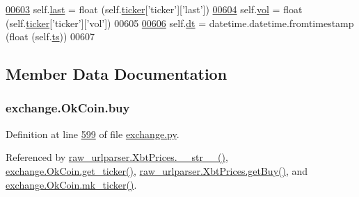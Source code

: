 \begin{DoxyCode}
\hypertarget{classexchange_1_1_ok_coin.tex_l00603}{}\hyperlink{classexchange_1_1_ok_coin_a726afbe3a75835fdcbe523aed8d6763c}{00603}         self.\hyperlink{classexchange_1_1_ok_coin_a726afbe3a75835fdcbe523aed8d6763c}{last} = float (self.\hyperlink{classexchange_1_1_exchange_a7cf9e52f993627955a2e242c388daaeb}{ticker}[\textcolor{stringliteral}{'ticker'}][\textcolor{stringliteral}{'last'}])
\hypertarget{classexchange_1_1_ok_coin.tex_l00604}{}\hyperlink{classexchange_1_1_ok_coin_ad0e78d6b3c0a24504be72a0216fc6549}{00604}         self.\hyperlink{classexchange_1_1_ok_coin_ad0e78d6b3c0a24504be72a0216fc6549}{vol}  = float (self.\hyperlink{classexchange_1_1_exchange_a7cf9e52f993627955a2e242c388daaeb}{ticker}[\textcolor{stringliteral}{'ticker'}][\textcolor{stringliteral}{'vol'}])
00605     
\hypertarget{classexchange_1_1_ok_coin.tex_l00606}{}\hyperlink{classexchange_1_1_ok_coin_ade9d7cddcfa54f2b1ba5452854bfd48b}{00606}         self.\hyperlink{classexchange_1_1_ok_coin_ade9d7cddcfa54f2b1ba5452854bfd48b}{dt} = datetime.datetime.fromtimestamp (float (self.\hyperlink{classexchange_1_1_ok_coin_a0fe6263a7f58a6fa8a688929976b7e4a}{ts}))
00607     
\end{DoxyCode}


\subsection{Member Data Documentation}
\subsubsection[{\texorpdfstring{buy}{buy}}]{\setlength{\rightskip}{0pt plus 5cm}exchange.\+Ok\+Coin.\+buy}\hypertarget{classexchange_1_1_ok_coin_aaf828e37142a83cbfb12d193313f6d43}{}\label{classexchange_1_1_ok_coin_aaf828e37142a83cbfb12d193313f6d43}


Definition at line \hyperlink{exchange_8py_source_l00599}{599} of file \hyperlink{exchange_8py_source}{exchange.\+py}.



Referenced by \hyperlink{raw__urlparser_8py_source_l00074}{raw\+\_\+urlparser.\+Xbt\+Prices.\+\_\+\+\_\+str\+\_\+\+\_\+()}, \hyperlink{exchange_8py_source_l00608}{exchange.\+Ok\+Coin.\+get\+\_\+ticker()}, \hyperlink{raw__urlparser_8py_source_l00062}{raw\+\_\+urlparser.\+Xbt\+Prices.\+get\+Buy()}, and \hyperlink{exchange_8py_source_l00622}{exchange.\+Ok\+Coin.\+mk\+\_\+ticker()}.

